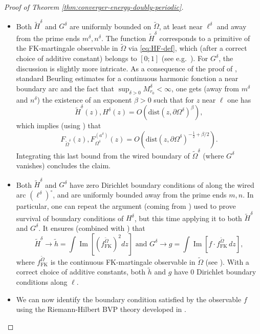 \documentclass[reqno]{amsart}
\numberwithin{equation}{section}
\theoremstyle{definition}
\theoremstyle{remark}
\renewcommand\Im{\operatorname{Im}}
\begin{document}
\begin{proof}[Proof of Theorem \ref{thm:converger-energy-doubly-periodic}]
\begin{enumerate}
\begin{itemize}
		\item Both $\widetilde{H}^\delta$ 	and $G^\delta$ are uniformly bounded on $\widetilde{\Omega}$, at least near $\ell^\delta $ and away from the prime ends $m^\delta,n^\delta$. The function $\widetilde{H}^\delta$ corresponds to a primitive of the FK-martingale observable in $\widetilde{\Omega}$ via \eqref{eq:HF-def}, which (after a correct choice of additive constant) belongs to $[0;1]$ (see e.g.\ \cite[Corollary 2.12]{Che20}). For $G^\delta$, the discussion is slightly more intricate. As a consequence of the proof of \cite[Theorem 4.1]{Che20},  standard Beurling estimates for a  continuous harmonic fonction a near boundary arc and the fact that $\sup_{\delta>0}M^{\delta}_{r_0}<\infty $, one gets (away from $m^\delta$ and $n^\delta$) the existence of an exponent $\beta >0 $ such that for $z$ near $\ell$ one has
\begin{equation*}
		\widetilde{H}^\delta(z), H^{\delta}(z) = O(\textrm{dist}(z,\partial\Omega^\delta)^\beta), 
\end{equation*}
which implies (using \cite[Corollary 2.20]{Che20}) that 
\begin{equation*}
		F_{\widetilde{\Omega}^\delta}(z), F^{(a^\delta)}_{\Omega^\delta}(z) = O(\textrm{dist}(z,\partial\Omega^\delta)^{-\frac{1}{2}+\beta/2}).
\end{equation*}
Integrating this last bound from the wired boundary of $\widetilde{\Omega}^\delta $ (where $G^\delta$ vanishes) concludes the claim.	
\item Both $\widetilde{H}^\delta$ and $G^\delta$ have zero Dirichlet boundary conditions of along the wired arc $(\ell^\delta)^\circ$, and are uniformly bounded away from the prime ends $m,n$. In particular, one can repeat the argument (coming from \cite[Theorem~4.1]{Che20}) used to prove survival of boundary conditions of $H^\delta$, but this time applying it to both $\widetilde{H}^\delta$ and $G^\delta$. It ensures (combined with \cite[Theorem 1.2]{Che20}) that
\begin{equation*}
\widetilde{H}^\delta \to \tilde{h}= \int \Im[(f^{\widetilde{\Omega}}_{\mathrm{FK}})^2dz] \textrm{ and }  G^\delta \to g = \int \Im[f \cdot f^{\widetilde{\Omega}}_{\mathrm{FK}}\,dz],
\end{equation*}
where $f^{\widetilde{\Omega}}_{\mathrm{FK}}$ is the continuous FK-martingale observable in $\widetilde{\Omega}$ (see \cite[Theorem 1.2]{Che20}). With a correct choice of additive constants, both $\tilde{h}$ and $g$ have $0$	Dirichlet boundary conditions along $\ell$.
\item We can now identify the boundary condition satisfied by the observable $f$ using the Riemann-Hilbert BVP theory developed in \cite[Section 6.2.2]{WanPHD}. 

\end{itemize}
\end{enumerate}
\end{proof}
\end{document}
